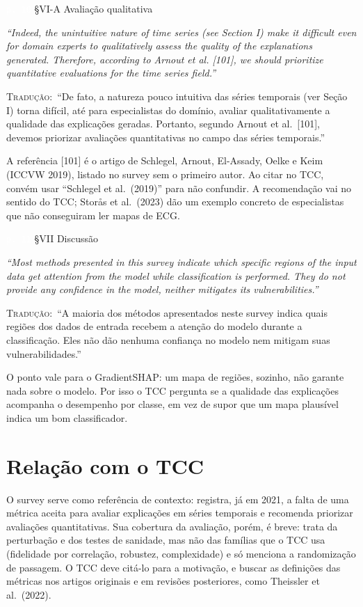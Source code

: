 \documentclass[11pt,a4paper]{article}
\newcommand{\pagechip}[1]{{\setlength{\fboxsep}{1.5pt}\colorbox{cAcc}{\textcolor{white}{\scriptsize\texttt{#1}}}}}
\newenvironment{origquote}{\par\itshape\small}{\par}
\newenvironment{tradquote}{\par\small\textsc{Tradução:}\ }{\par}
\newcommand{\explab}[1]{\par\smallskip{\small\color{cAcc}\textbf{\MakeUppercase{#1}}}\par}
\begin{document}
\begin{citacard}{\pagechip{p. 10} §VI-A Avaliação qualitativa}
\begin{origquote}“Indeed, the unintuitive nature of time series (see Section I) make it difficult even for domain experts to qualitatively assess the quality of the explanations generated. Therefore, according to Arnout et al. [101], we should prioritize quantitative evaluations for the time series field.”\end{origquote}
\begin{tradquote}“De fato, a natureza pouco intuitiva das séries temporais (ver Seção I) torna difícil, até para especialistas do domínio, avaliar qualitativamente a qualidade das explicações geradas. Portanto, segundo Arnout et al.\ [101], devemos priorizar avaliações quantitativas no campo das séries temporais.”\end{tradquote}
\explab{Explicação}
A referência [101] é o artigo de Schlegel, Arnout, El-Assady, Oelke e Keim (ICCVW 2019), listado no survey sem o primeiro autor. Ao citar no TCC, convém usar “Schlegel et al.\ (2019)” para não confundir. A recomendação vai no sentido do TCC; Storås et al.\ (2023) dão um exemplo concreto de especialistas que não conseguiram ler mapas de ECG.
\end{citacard}

\begin{citacard}{\pagechip{p. 11} §VII Discussão}
\begin{origquote}“Most methods presented in this survey indicate which specific regions of the input data get attention from the model while classification is performed. They do not provide any confidence in the model, neither mitigates its vulnerabilities.”\end{origquote}
\begin{tradquote}“A maioria dos métodos apresentados neste survey indica quais regiões dos dados de entrada recebem a atenção do modelo durante a classificação. Eles não dão nenhuma confiança no modelo nem mitigam suas vulnerabilidades.”\end{tradquote}
\explab{Explicação}
O ponto vale para o GradientSHAP: um mapa de regiões, sozinho, não garante nada sobre o modelo. Por isso o TCC pergunta se a qualidade das explicações acompanha o desempenho por classe, em vez de supor que um mapa plausível indica um bom classificador.
\end{citacard}

\section{Relação com o TCC}
O survey serve como referência de contexto: registra, já em 2021, a falta de uma métrica aceita para avaliar explicações em séries temporais e recomenda priorizar avaliações quantitativas. Sua cobertura da avaliação, porém, é breve: trata da perturbação e dos testes de sanidade, mas não das famílias que o TCC usa (fidelidade por correlação, robustez, complexidade) e só menciona a randomização de passagem. O TCC deve citá-lo para a motivação, e buscar as definições das métricas nos artigos originais e em revisões posteriores, como Theissler et al.\ (2022).
\end{document}
